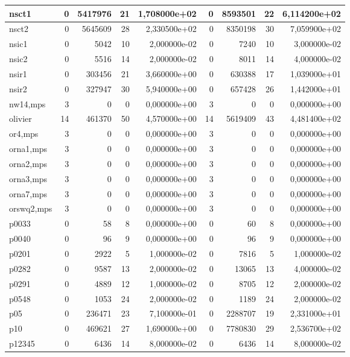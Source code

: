 \begin{tabular}{|l|r|r|r|r|r|r|r|r|}
nsct1 & 0 & 5417976 & 21 & 1,708000e+02 & 0 & 8593501 & 22 & 6,114200e+02 \\ \hline
nsct2 & 0 & 5645609 & 28 & 2,330500e+02 & 0 & 8350198 & 30 & 7,059900e+02 \\ \hline
nsic1 & 0 & 5042 & 10 & 2,000000e-02 & 0 & 7240 & 10 & 3,000000e-02 \\ \hline
nsic2 & 0 & 5516 & 14 & 2,000000e-02 & 0 & 8011 & 14 & 4,000000e-02 \\ \hline
nsir1 & 0 & 303456 & 21 & 3,660000e+00 & 0 & 630388 & 17 & 1,039000e+01 \\ \hline
nsir2 & 0 & 327947 & 30 & 5,940000e+00 & 0 & 657428 & 26 & 1,442000e+01 \\ \hline
nw14,mps & 3 & 0 & 0 & 0,000000e+00 & 3 & 0 & 0 & 0,000000e+00 \\ \hline
olivier & 14 & 461370 & 50 & 4,570000e+00 & 14 & 5619409 & 43 & 4,481400e+02 \\ \hline
or4,mps & 3 & 0 & 0 & 0,000000e+00 & 3 & 0 & 0 & 0,000000e+00 \\ \hline
orna1,mps & 3 & 0 & 0 & 0,000000e+00 & 3 & 0 & 0 & 0,000000e+00 \\ \hline
orna2,mps & 3 & 0 & 0 & 0,000000e+00 & 3 & 0 & 0 & 0,000000e+00 \\ \hline
orna3,mps & 3 & 0 & 0 & 0,000000e+00 & 3 & 0 & 0 & 0,000000e+00 \\ \hline
orna7,mps & 3 & 0 & 0 & 0,000000e+00 & 3 & 0 & 0 & 0,000000e+00 \\ \hline
orswq2,mps & 3 & 0 & 0 & 0,000000e+00 & 3 & 0 & 0 & 0,000000e+00 \\ \hline
p0033 & 0 & 58 & 8 & 0,000000e+00 & 0 & 60 & 8 & 0,000000e+00 \\ \hline
p0040 & 0 & 96 & 9 & 0,000000e+00 & 0 & 96 & 9 & 0,000000e+00 \\ \hline
p0201 & 0 & 2922 & 5 & 1,000000e-02 & 0 & 7816 & 5 & 1,000000e-02 \\ \hline
p0282 & 0 & 9587 & 13 & 2,000000e-02 & 0 & 13065 & 13 & 4,000000e-02 \\ \hline
p0291 & 0 & 4889 & 12 & 1,000000e-02 & 0 & 8705 & 12 & 2,000000e-02 \\ \hline
p0548 & 0 & 1053 & 24 & 2,000000e-02 & 0 & 1189 & 24 & 2,000000e-02 \\ \hline
p05 & 0 & 236471 & 23 & 7,100000e-01 & 0 & 2288707 & 19 & 2,331000e+01 \\ \hline
p10 & 0 & 469621 & 27 & 1,690000e+00 & 0 & 7780830 & 29 & 2,536700e+02 \\ \hline
p12345 & 0 & 6436 & 14 & 8,000000e-02 & 0 & 6436 & 14 & 8,000000e-02 \\ \hline

\end{tabular}
